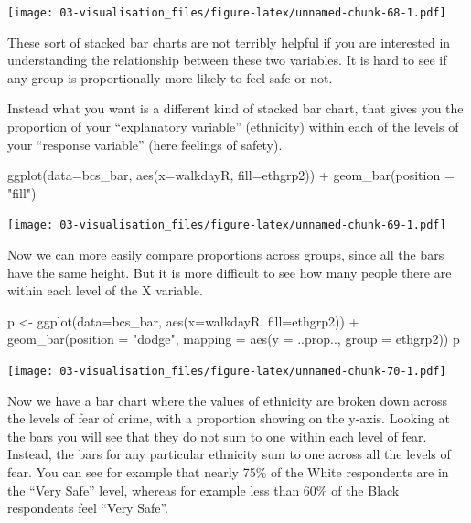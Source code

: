 \documentclass[
]{book}
\newenvironment{Shaded}{\begin{snugshade}}{\end{snugshade}}
\newcommand{\AttributeTok}[1]{\textcolor[rgb]{0.77,0.63,0.00}{#1}}
\newcommand{\FunctionTok}[1]{\textcolor[rgb]{0.00,0.00,0.00}{#1}}
\newcommand{\NormalTok}[1]{#1}
\newcommand{\OtherTok}[1]{\textcolor[rgb]{0.56,0.35,0.01}{#1}}
\newcommand{\SpecialCharTok}[1]{\textcolor[rgb]{0.00,0.00,0.00}{#1}}
\newcommand{\StringTok}[1]{\textcolor[rgb]{0.31,0.60,0.02}{#1}}
\begin{document}
\texttt{[image: 03-visualisation\_files/figure-latex/unnamed-chunk-68-1.pdf]}

These sort of stacked bar charts are not terribly helpful if you are interested in understanding the relationship between these two variables. It is hard to see if any group is proportionally more likely to feel safe or not.

Instead what you want is a different kind of stacked bar chart, that gives you the proportion of your ``explanatory variable'' (ethnicity) within each of the levels of your ``response variable'' (here feelings of safety).

\begin{Shaded}
\begin{Highlighting}[]
\FunctionTok{ggplot}\NormalTok{(}\AttributeTok{data=}\NormalTok{bcs\_bar, }\FunctionTok{aes}\NormalTok{(}\AttributeTok{x=}\NormalTok{walkdayR, }\AttributeTok{fill=}\NormalTok{ethgrp2)) }\SpecialCharTok{+}
  \FunctionTok{geom\_bar}\NormalTok{(}\AttributeTok{position =} \StringTok{"fill"}\NormalTok{)}
\end{Highlighting}
\end{Shaded}

\texttt{[image: 03-visualisation\_files/figure-latex/unnamed-chunk-69-1.pdf]}

Now we can more easily compare proportions across groups, since all the bars have the same height. But it is more difficult to see how many people there are within each level of the X variable.

\begin{Shaded}
\begin{Highlighting}[]
\NormalTok{p }\OtherTok{\textless{}{-}} \FunctionTok{ggplot}\NormalTok{(}\AttributeTok{data=}\NormalTok{bcs\_bar, }\FunctionTok{aes}\NormalTok{(}\AttributeTok{x=}\NormalTok{walkdayR, }\AttributeTok{fill=}\NormalTok{ethgrp2)) }\SpecialCharTok{+} \FunctionTok{geom\_bar}\NormalTok{(}\AttributeTok{position =} \StringTok{"dodge"}\NormalTok{,}
             \AttributeTok{mapping =} \FunctionTok{aes}\NormalTok{(}\AttributeTok{y =}\NormalTok{ ..prop.., }\AttributeTok{group =}\NormalTok{ ethgrp2))}
\NormalTok{p}
\end{Highlighting}
\end{Shaded}

\texttt{[image: 03-visualisation\_files/figure-latex/unnamed-chunk-70-1.pdf]}

Now we have a bar chart where the values of ethnicity are broken down across the levels of fear of crime, with a proportion showing on the y-axis. Looking at the bars you will see that they do not sum to one within each level of fear. Instead, the bars for any particular ethnicity sum to one across all the levels of fear. You can see for example that nearly 75\% of the White respondents are in the ``Very Safe'' level, whereas for example less than 60\% of the Black respondents feel ``Very Safe''.
\end{document}
